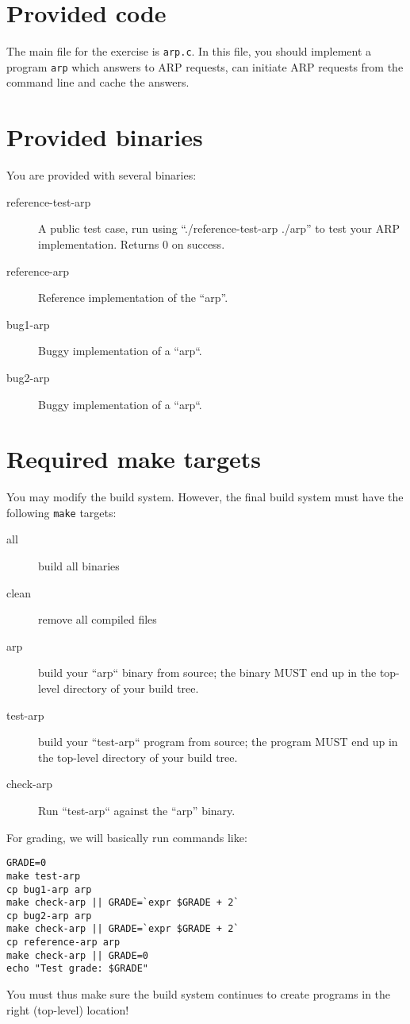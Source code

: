 \documentclass{article}
\begin{document}




\section{Provided code}



The main file for the exercise is {\tt arp.c}. In this file, you
should implement a program {\tt arp} which answers to ARP requests,
can initiate ARP requests from the command line and cache the answers.


\section{Provided binaries} \label{sec:binaries}

You are provided with several binaries:
\begin{description}
\item[reference-test-arp] A public test case, run using ``./reference-test-arp ./arp''
  to test your ARP implementation. Returns 0 on success.
\item[reference-arp] Reference implementation of the ``arp''.
\item[bug1-arp] Buggy implementation of a ``arp``.
\item[bug2-arp] Buggy implementation of a ``arp``.
\end{description}

\newpage
\section{Required make targets}

You may modify the build system. However, the final build system must
have the following {\tt make} targets:

\begin{description}
\item[all] build all binaries
\item[clean] remove all compiled files
\item[arp] build your ``arp`` binary from source; the binary MUST end up in the top-level directory of your build tree.
\item[test-arp] build your ``test-arp`` program from source; the program MUST end up in the top-level directory of your build tree.
\item[check-arp] Run ``test-arp`` against the ``arp'' binary.
\end{description}

For grading, we will basically run commands like:
\begin{verbatim}
GRADE=0
make test-arp
cp bug1-arp arp
make check-arp || GRADE=`expr $GRADE + 2`
cp bug2-arp arp
make check-arp || GRADE=`expr $GRADE + 2`
cp reference-arp arp
make check-arp || GRADE=0
echo "Test grade: $GRADE"
\end{verbatim}

You must thus make sure the build system continues to create programs in the
right (top-level) location!
\end{document}
